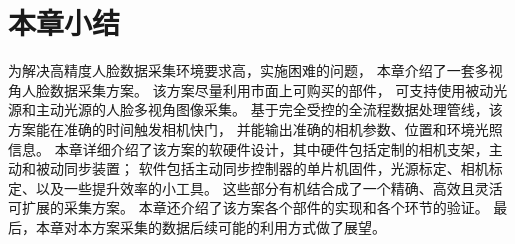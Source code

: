 \section*{本章小结}

为解决高精度人脸数据采集环境要求高，实施困难的问题，
本章介绍了一套多视角人脸数据采集方案。
该方案尽量利用市面上可购买的部件，
可支持使用被动光源和主动光源的人脸多视角图像采集。
基于完全受控的全流程数据处理管线，该方案能在准确的时间触发相机快门，
并能输出准确的相机参数、位置和环境光照信息。
本章详细介绍了该方案的软硬件设计，其中硬件包括定制的相机支架，主动和被动同步装置；
软件包括主动同步控制器的单片机固件，光源标定、相机标定、以及一些提升效率的小工具。
这些部分有机结合成了一个精确、高效且灵活可扩展的采集方案。
本章还介绍了该方案各个部件的实现和各个环节的验证。
最后，本章对本方案采集的数据后续可能的利用方式做了展望。
